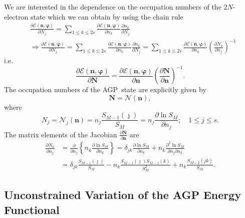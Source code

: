 \documentclass[aps,preprint]{revtex4}%
\begin{document}
We are interested in the dependence on the occupation numbers of the
$2N$-electron state which we can obtain by using the chain rule
\begin{align}
&  \frac{\partial\mathcal{E}\left(  \mathbf{n,\varphi}\right)  }{\partial
N_{j}}=\sum_{1\leq k\leq2s}\frac{\partial\mathcal{E}\left(  \mathbf{n,\varphi
}\right)  }{\partial n_{k}}\frac{\partial n_{k}}{\partial N_{j}}\nonumber\\
&  \Rightarrow\frac{\partial\mathcal{E}\left(  \mathbf{n,\varphi}\right)
}{\partial N_{j}}=\sum_{1\leq k\leq2s}\frac{\partial\mathcal{E}\left(
\mathbf{n,\varphi}\right)  }{\partial n_{k}}\frac{\partial n_{k}}{\partial
N_{j}}=\sum_{1\leq k\leq2s}\frac{\partial\mathcal{E}\left(  \mathbf{n,\varphi
}\right)  }{\partial n_{k}}\left(  \frac{\partial N_{k}}{\partial n_{j}%
}\right)  ^{-1}%
\end{align}
i.e.%
\begin{equation}
\frac{\partial\mathcal{E}\left(  \mathbf{n,\varphi}\right)  }{\partial
\mathbf{N}}=\frac{\partial\mathcal{E}\left(  \mathbf{n,\varphi}\right)
}{\partial\mathbf{n}}\left(  \frac{\partial\mathbf{N}}{\partial\mathbf{n}%
}\right)  ^{-1}.
\end{equation}
The occupation numbers of the AGP\ state are explicitly given by
\begin{equation}
\mathbf{N}=\mathcal{N}\left(  \mathbf{n}\right)  ,
\end{equation}
where
\begin{equation}
N_{j}=\mathcal{N}_{j}\left(  \mathbf{n}\right)  =n_{j}\frac{S_{M-1}\left(
\jmath\right)  }{S_{M}}=n_{j}\frac{\partial\ln S_{M}}{\partial n_{j}}%
;\quad1\leq j\leq s.
\end{equation}
The matrix elements of the Jacobian $\frac{\partial\mathbf{N}}{\partial
\mathbf{n}}$ are
\begin{align}
\frac{\partial N_{k}}{\partial n_{j}}  &  =\frac{\partial}{\partial n_{j}%
}\left\{  n_{k}\frac{\partial\ln S_{M}}{\partial n_{k}}\right\}  =\delta
_{jk}\frac{\partial\ln S_{M}}{\partial n_{k}}+n_{k}\frac{\partial^{2}\ln
S_{M}}{\partial n_{j}\partial n_{k}}\nonumber\\
&  =\delta_{jk}\frac{S_{M-1}\left(  \jmath\right)  }{S_{M}}-n_{k}\frac
{S_{M-1}\left(  \jmath\right)  S_{M-1}\left(  k\right)  }{S_{M}^{2}}%
+n_{k}\frac{S_{M-2}\left(  jk\right)  }{S_{M}}.
\end{align}


\subsection{Unconstrained Variation of the AGP Energy Functional}
\end{document}
